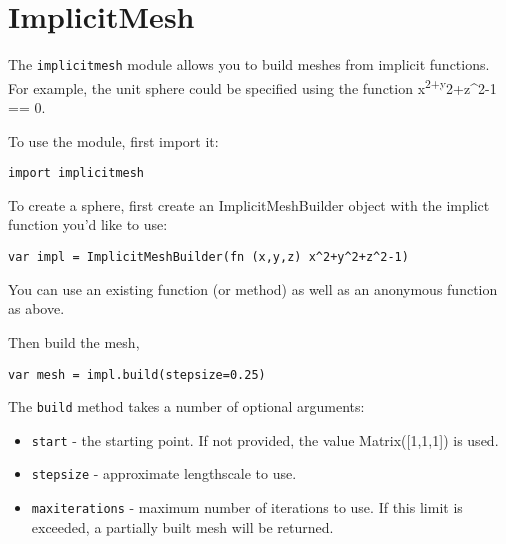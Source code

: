 \hypertarget{implicitmesh}{%
\section{ImplicitMesh}\label{implicitmesh}}

The \texttt{implicitmesh} module allows you to build meshes from
implicit functions. For example, the unit sphere could be specified
using the function x\textsuperscript{2+y}2+z\^{}2-1 == 0.

To use the module, first import it:

\begin{lstlisting}
import implicitmesh
\end{lstlisting}

To create a sphere, first create an ImplicitMeshBuilder object with the
implict function you'd like to use:

\begin{lstlisting}
var impl = ImplicitMeshBuilder(fn (x,y,z) x^2+y^2+z^2-1)
\end{lstlisting}

You can use an existing function (or method) as well as an anonymous
function as above.

Then build the mesh,

\begin{lstlisting}
var mesh = impl.build(stepsize=0.25)
\end{lstlisting}

The \texttt{build} method takes a number of optional arguments:

\begin{itemize}

\item
  \texttt{start} - the starting point. If not provided, the value
  Matrix({[}1,1,1{]}) is used.
\item
  \texttt{stepsize} - approximate lengthscale to use.
\item
  \texttt{maxiterations} - maximum number of iterations to use. If this
  limit is exceeded, a partially built mesh will be returned.
\end{itemize}
